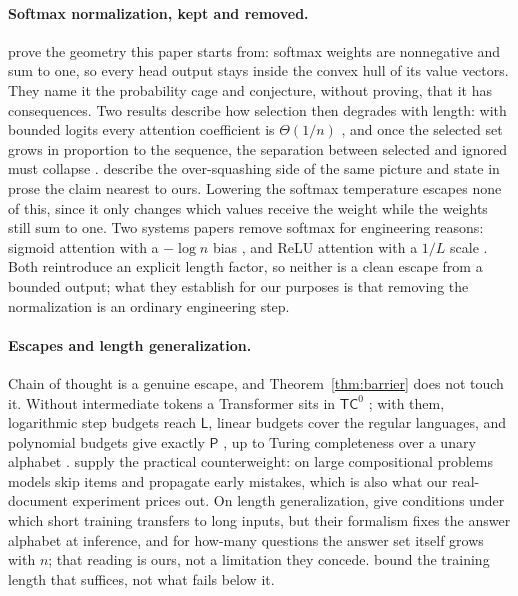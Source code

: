 \documentclass[10pt]{article}
\theoremstyle{definition}
\begin{document}
\paragraph{Softmax normalization, kept and removed.}

\citet{richter2020cage} prove the geometry this paper starts from: softmax
weights are nonnegative and sum to one, so every head output stays inside
the convex hull of its value vectors. They name it the probability cage and
conjecture, without proving, that it has consequences. Two results describe
how selection then degrades with length: with bounded logits every
attention coefficient is $\Theta(1/n)$ \citep{velickovic2024softmax}, and
once the selected set grows in proportion to the sequence, the separation
between selected and ignored must collapse \citep{mudarisov2025norm}.
\citet{barbero2024glasses} describe the over-squashing side of the same
picture and state in prose the claim nearest to ours. Lowering the softmax
temperature escapes none of this, since it only changes which values
receive the weight while the weights still sum to one. Two systems papers
remove softmax for engineering reasons: sigmoid attention with a $-\log n$
bias \citep{ramapuram2024sigmoid}, and ReLU attention with a $1/L$ scale
\citep{wortsman2023relu}. Both reintroduce an explicit length factor, so
neither is a clean escape from a bounded output; what they establish for
our purposes is that removing the normalization is an ordinary engineering
step.

\paragraph{Escapes and length generalization.}

Chain of thought is a genuine escape, and Theorem~\ref{thm:barrier} does
not touch it. Without intermediate tokens a Transformer sits in
$\mathsf{TC}^0$ \citep{merrill2023}; with them, logarithmic step budgets
reach $\mathsf{L}$, linear budgets cover the regular languages, and
polynomial budgets give exactly $\mathsf{P}$ \citep{merrill2023cot}, up to
Turing completeness over a unary alphabet \citep{turing2025cot}.
\citet{dziri2023faith} supply the practical counterweight: on large
compositional problems models skip items and propagate early mistakes,
which is also what our real-document experiment prices out. On length
generalization, \citet{huang2024lengthgen} give conditions under which
short training transfers to long inputs, but their formalism fixes the
answer alphabet at inference, and for how-many questions the answer set
itself grows with $n$; that reading is ours, not a limitation they concede.
\citet{izzo2025lengthgen} bound the training length that suffices, not what
fails below it.
\end{document}
